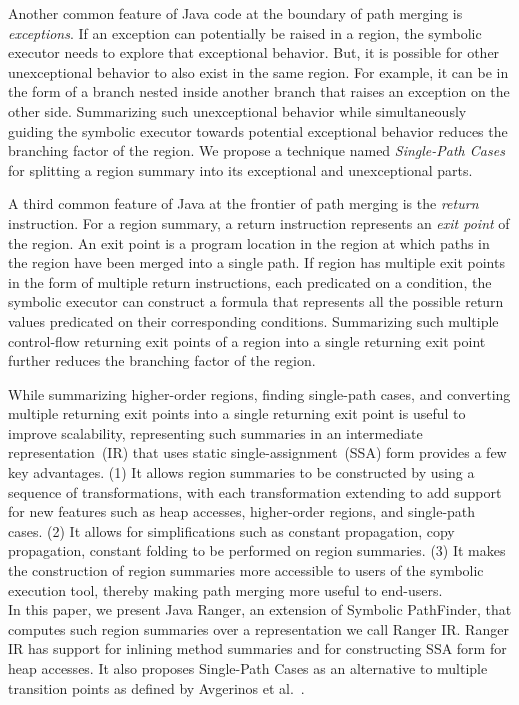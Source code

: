 Another common feature of Java code at the boundary of path merging is \textit{exceptions}.
%
If an exception can potentially be raised in a region, the symbolic executor needs to explore that exceptional behavior.
%
But, it is possible for other unexceptional behavior to also exist in the same region.
%
For example, it can be in the form of a branch nested inside another branch that raises an exception on the other side.
%
Summarizing such unexceptional behavior while simultaneously guiding the symbolic executor towards potential exceptional
behavior reduces the branching factor of the region.
%
We propose a technique named \textit{Single-Path Cases} for splitting a region summary into its exceptional and
unexceptional parts.

A third common feature of Java at the frontier of path merging is the \textit{return} instruction.
%
For a region summary, a return instruction represents an \textit{exit point} of the region.
%
An exit point is a program location in the region at which paths in the region have been merged into a single path.
%
If region has multiple exit points in the form of multiple return instructions, each predicated on a condition, the symbolic
executor can construct a formula that represents all the possible return values predicated on their corresponding conditions.
%
Summarizing such multiple control-flow returning exit points of a region into a single returning exit point further
reduces the branching factor of the region.

While summarizing higher-order regions, finding single-path cases, and converting multiple returning exit points into a
single returning exit point is useful to improve scalability, representing such summaries in an intermediate
representation~(IR) that uses static single-assignment~(SSA) form provides a few key advantages.
%
(1) It allows region summaries to be constructed by using a sequence of transformations, with each transformation
extending to add support for new features such as heap accesses, higher-order regions, and single-path cases.
%
(2) It allows for simplifications such as constant propagation, copy propagation, constant folding to be performed on
region summaries.
%
(3) It makes the construction of region summaries more accessible to users of the symbolic execution tool, thereby making
path merging more useful to end-users.\\
%
In this paper, we present Java Ranger, an extension of Symbolic PathFinder, that computes such region summaries over a representation we call
Ranger IR.
%
Ranger IR has support for inlining method summaries and for constructing SSA form for heap accesses.
%
It also proposes Single-Path Cases as an alternative to multiple transition points as
defined by Avgerinos et al.~\cite{veritesting}.

